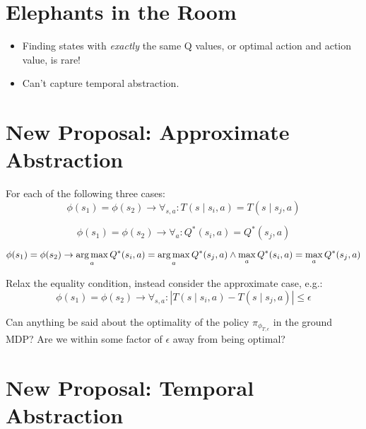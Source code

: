 \documentclass[11pt]{amsart}
\begin{document}
\section{Elephants in the Room}

\begin{itemize}
\item Finding states with {\it exactly} the same Q values, or optimal action and action value, is rare!
\item Can't capture temporal abstraction.
\end{itemize}

\midline

\newpage
\section{New Proposal: Approximate Abstraction}


For each of the following three cases:
\begin{equation}
 \phi(s_1) = \phi(s_2) \rightarrow \forall_{s,a} : T(s \mid s_i, a) = T(s \mid s_j, a)
\end{equation}

\begin{equation}
 \phi(s_1) = \phi(s_2) \rightarrow \forall_a : Q^*(s_i, a) = Q^*(s_j, a)
\end{equation}

\begin{equation}
 \phi(s_1) = \phi(s_2) \rightarrow \operatorname*{arg\,max}_a Q^*(s_i, a) = \operatorname*{arg\,max}_a Q^*(s_j, a) \wedge \max_a Q^*(s_i, a) = \max_a Q^*(s_j, a)
\end{equation}

Relax the equality condition, instead consider the approximate case, e.g.:
\begin{equation}
 \phi(s_1) = \phi(s_2) \rightarrow \forall_{s,a} : |T(s \mid s_i, a) - T(s \mid s_j, a)| \leq \epsilon
\end{equation}

 Can anything be said about the optimality of the policy $\pi_{\phi_{T,\epsilon}}$ in the ground MDP? Are we within some factor of $\epsilon$ away from being optimal?


\newpage
\section{New Proposal: Temporal Abstraction}
\end{document}
